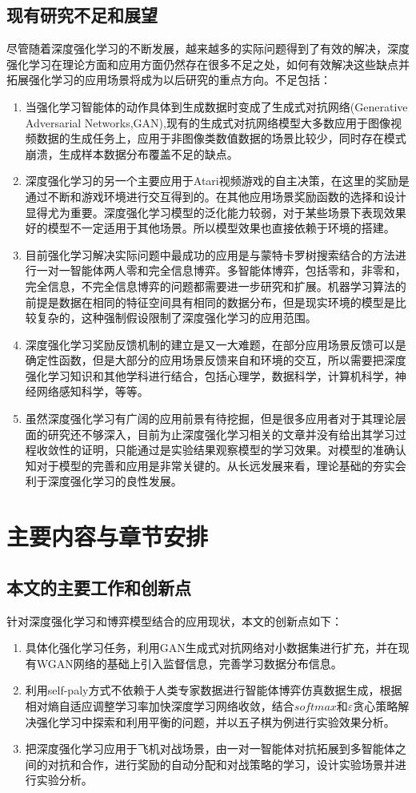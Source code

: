 \subsection{现有研究不足和展望}
尽管随着深度强化学习的不断发展，越来越多的实际问题得到了有效的解决，深度强化学习在理论方面和应用方面仍然存在很多不足之处，如何有效解决这些缺点并拓展强化学习的应用场景将成为以后研究的重点方向。不足包括：
\begin{enumerate}
	\item 当强化学习智能体的动作具体到生成数据时变成了生成式对抗网络(Generative Adversarial Networks,GAN),现有的生成式对抗网络模型大多数应用于图像视频数据的生成任务上，应用于非图像类数值数据的场景比较少，同时存在模式崩溃，生成样本数据分布覆盖不足的缺点。
	\item 深度强化学习的另一个主要应用于Atari视频游戏的自主决策，在这里的奖励是通过不断和游戏环境进行交互得到的。在其他应用场景奖励函数的选择和设计显得尤为重要。深度强化学习模型的泛化能力较弱，对于某些场景下表现效果好的模型不一定适用于其他场景。所以模型效果也直接依赖于环境的搭建。
	\item 目前强化学习解决实际问题中最成功的应用是与蒙特卡罗树搜索结合的方法进行一对一智能体两人零和完全信息博弈。多智能体博弈，包括零和，非零和，完全信息，不完全信息博弈的问题都需要进一步研究和扩展。机器学习算法的前提是数据在相同的特征空间具有相同的数据分布，但是现实环境的模型是比较复杂的，这种强制假设限制了深度强化学习的应用范围。
	\item 深度强化学习奖励反馈机制的建立是又一大难题，在部分应用场景反馈可以是确定性函数，但是大部分的应用场景反馈来自和环境的交互，所以需要把深度强化学习知识和其他学科进行结合，包括心理学，数据科学，计算机科学，神经网络感知科学，等等。
	\item 虽然深度强化学习有广阔的应用前景有待挖掘，但是很多应用者对于其理论层面的研究还不够深入，目前为止深度强化学习相关的文章并没有给出其学习过程收敛性的证明，只能通过是实验结果观察模型的学习效果。对模型的准确认知对于模型的完善和应用是非常关键的。从长远发展来看，理论基础的夯实会利于深度强化学习的良性发展。
\end{enumerate}
\section{主要内容与章节安排}
\subsection{本文的主要工作和创新点}
针对深度强化学习和博弈模型结合的应用现状，本文的创新点如下：
\begin{enumerate}
	\item 具体化强化学习任务，利用GAN生成式对抗网络对小数据集进行扩充，并在现有WGAN网络的基础上引入监督信息，完善学习数据分布信息。
	\item 利用self-paly方式不依赖于人类专家数据进行智能体博弈仿真数据生成，根据相对熵自适应调整学习率加快深度学习网络收敛，结合$softmax$和$\varepsilon$贪心策略解决强化学习中探索和利用平衡的问题，并以五子棋为例进行实验效果分析。
	\item 把深度强化学习应用于飞机对战场景，由一对一智能体对抗拓展到多智能体之间的对抗和合作，进行奖励的自动分配和对战策略的学习，设计实验场景并进行实验分析。
\end{enumerate}
